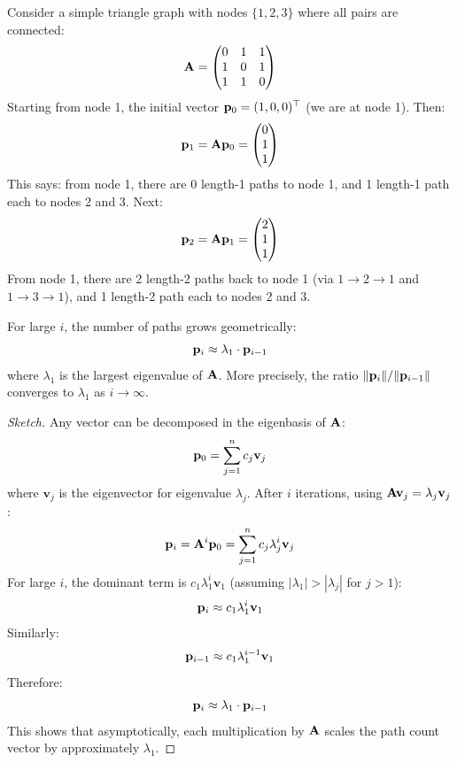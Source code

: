 \begin{notechapter}
\begin{example}
Consider a simple triangle graph with nodes $\{1, 2, 3\}$ where all pairs are connected:
\[
\mathbf{A} = \begin{pmatrix} 0 & 1 & 1 \\ 1 & 0 & 1 \\ 1 & 1 & 0 \end{pmatrix}
\]
Starting from node 1, the initial vector $\mathbf{p}_0 = (1, 0, 0)^\top$ (we are at node 1). Then:
\[
\mathbf{p}_1 = \mathbf{A} \mathbf{p}_0 = \begin{pmatrix} 0 \\ 1 \\ 1 \end{pmatrix}
\]
This says: from node 1, there are 0 length-1 paths to node 1, and 1 length-1 path each to nodes 2 and 3. Next:
\[
\mathbf{p}_2 = \mathbf{A} \mathbf{p}_1 = \begin{pmatrix} 2 \\ 1 \\ 1 \end{pmatrix}
\]
From node 1, there are 2 length-2 paths back to node 1 (via $1 \to 2 \to 1$ and $1 \to 3 \to 1$), and 1 length-2 path each to nodes 2 and 3.
\end{example}

\begin{theorem}
\label{lhn-similarity:thm:path-growth}
For large $i$, the number of paths grows geometrically:
\begin{equation}
\mathbf{p}_i \approx \lambda_1 \cdot \mathbf{p}_{i-1}
\label{lhn-similarity:eq:path-growth}
\end{equation}
where $\lambda_1$ is the largest eigenvalue of $\mathbf{A}$. More precisely, the ratio $\|\mathbf{p}_i\| / \|\mathbf{p}_{i-1}\|$ converges to $\lambda_1$ as $i \to \infty$.
\end{theorem}

\begin{proof}[Sketch]
Any vector can be decomposed in the eigenbasis of $\mathbf{A}$:
\[
\mathbf{p}_0 = \sum_{j=1}^{n} c_j \mathbf{v}_j
\]
where $\mathbf{v}_j$ is the eigenvector for eigenvalue $\lambda_j$. After $i$ iterations, using $\mathbf{A} \mathbf{v}_j = \lambda_j \mathbf{v}_j$:
\[
\mathbf{p}_i = \mathbf{A}^i \mathbf{p}_0 = \sum_{j=1}^{n} c_j \lambda_j^i \mathbf{v}_j
\]
For large $i$, the dominant term is $c_1 \lambda_1^i \mathbf{v}_1$ (assuming $|\lambda_1| > |\lambda_j|$ for $j > 1$):
\[
\mathbf{p}_i \approx c_1 \lambda_1^i \mathbf{v}_1
\]
Similarly:
\[
\mathbf{p}_{i-1} \approx c_1 \lambda_1^{i-1} \mathbf{v}_1
\]
Therefore:
\[
\mathbf{p}_i \approx \lambda_1 \cdot \mathbf{p}_{i-1}
\]
This shows that asymptotically, each multiplication by $\mathbf{A}$ scales the path count vector by approximately $\lambda_1$.
\end{proof}


\end{notechapter}
